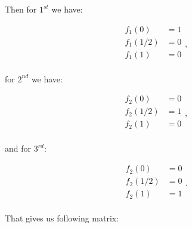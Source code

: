 \documentclass[10pt,b5paper,titlepage]{book}
\begin{document}
Then for $1^{st}$ we have:

\begin{equation}
    \begin{array}{ll}
        f_{1}(0) &= 1 \\
        f_{1}(1/2) &= 0 \\
        f_{1}(1) &= 0 \\
    \end{array}
,\end{equation}

for $2^{nd}$ we have:

\begin{equation}
    \begin{array}{ll}
        f_{2}(0) &= 0 \\
        f_{2}(1/2) &= 1 \\
        f_{2}(1) &= 0 \\
    \end{array}
,\end{equation}

and for $3^{rd}$:

\begin{equation}
    \begin{array}{ll}
        f_{2}(0) &= 0 \\
        f_{2}(1/2) &= 0 \\
        f_{2}(1) &= 1 \\
    \end{array}
.\end{equation}

That gives us following matrix:
\end{document}
